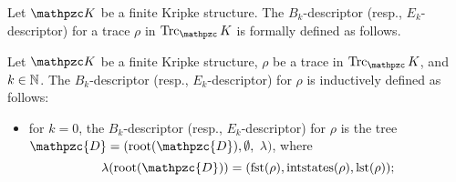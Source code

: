 Let $\Ku$ be a finite Kripke structure. The $B_k$-descriptor (resp., $E_k$-descriptor) for a trace $\rho$ in $\Trk_\Ku$ is formally defined as follows.
\begin{definition} \label{def:tracedescr}
Let $\Ku$ be a finite Kripke structure, $\rho$ be a trace in $\Trk_\Ku$, and $k\in\mathbb{N}$. The $B_k$-descriptor (resp., $E_k$-descriptor) for $\rho$ is inductively defined as follows:
    \begin{itemize}
        \item for $k=0$, the $B_k$-descriptor (resp., $E_k$-descriptor) for $\rho$ is the tree $\mathpzc{D} = (\Root(\mathpzc{D}),\emptyset,$ $\lambda)$, where 
        \begin{equation*}
            \lambda(\Root(\mathpzc{D}))=(\fst(\rho),\intstates(\rho), \lst(\rho));
        \end{equation*}                
        

\end{itemize}
\end{definition}
